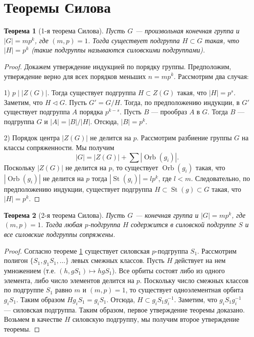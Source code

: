 \documentclass[12pt, titlepage, oneside]{amsbook}
\newcommand{\St}{\operatorname{St}}
\newcommand{\Orb}{\operatorname{Orb}}
\newtheorem{theorem}{Теорема}[chapter]
\theoremstyle{definition}
\theoremstyle{remark}
\begin{document}
\section{Теоремы Силова}

\begin{theorem}[1-я теорема Силова]
\label{1Sil} Пусть $G$ --- произвольная конечная группа и $|G|=mp^k$, где
$(m,p)=1$. Тогда существует подгруппа $H\subset G$ такая, что
$|H|=p^k$ (такие подгруппы называются \emph{силовскими подгруппами}).
\end{theorem}

\begin{proof}
Докажем утверждение индукцией по порядку группы. Предположим,
утверждение верно для всех порядков меньших $n=mp^k$. Рассмотрим два
случая:

1) $p\mid |Z(G)|$. Тогда существует
подгруппа $H\subset Z(G)$ такая, что $|H|=p^s$. Заметим, что
$H\triangleleft G$. Пусть $G'=G/H$. Тогда, по предположению
индукции, в $G'$ существует подгруппа $A$ порядка $p^{k-s}$. Пусть
$B$ --- прообраз $A$ в $G$. Тогда $B$ --- подгруппа $G$ и
$|A|=|B|/|H|$. Отсюда, $|B|=p^k$.


2) Порядок центра $|Z(G)|$ не делится на $p$. Рассмотрим разбиение
группы $G$ на классы сопряженности. Мы получим $$|G|= |Z(G)| + \sum
|\Orb(g_i)|.$$ Поскольку $|Z(G)|$ не делится на $p$, то существует
$\Orb(g_i)$ такая, что $|\Orb(g_i)|$ не делится на $p$ тогда
$|\St(g_i)|=lp^k$, где $l<m$. Следовательно, по предположению
индукции, существует подгруппа $H\subset\St(g)\subset G$ такая, что
$|H|=p^k$.
\end{proof}

\begin{theorem}[2-я теорема Силова]
\label{2Sil} Пусть $G$ --- конечная группа и $|G|=mp^k$, где
$(m,p)=1$. Тогда любая $p$-подгруппа $H$ содержится в силовской
подгруппе $S$ и все силовские подгруппы сопряжены.
\end{theorem}

\begin{proof}
Согласно теореме \ref{1Sil} существует силовская $p$-подгруппа
$S_1$. Рассмотрим полигон $\{S_1,g_1 S_1,\dots\}$ левых смежных
классов. Пусть $H$ действует на нем умножением (т.е. $(h,gS_1)\mapsto
hgS_1$). Все орбиты состоят либо из одного элемента, либо число
элементов делится на $p$. Поскольку число смежных классов по
подгруппе $S_1$ равно $m$ и $(m,p)=1$, то существует одноэлементная
орбита $g_i S_1$. Таким образом $Hg_iS_1=g_iS_1$. Отсюда, $H\subset
g_iS_1g_i^{-1}$. Заметим, что $g_iS_1g_i^{-1}$ --- силовская
подгруппа. Таким образом, первое утверждение теоремы доказано.
Возьмем в качестве $H$ силовскую подгруппу, мы получим второе
утверждение теоремы.
\end{proof}
\end{document}
